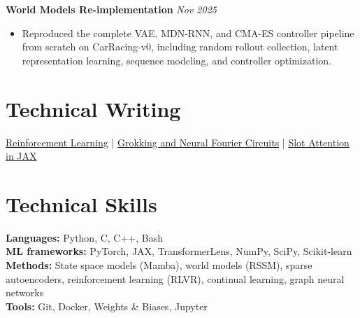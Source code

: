 \documentclass[10pt,a4paper]{article}
\begin{document}
\textbf{World Models Re-implementation}  \hfill \textit{Nov 2025}
\begin{itemize}
  \item Reproduced the complete VAE, MDN-RNN, and CMA-ES controller pipeline from scratch on CarRacing-v0, including random rollout collection, latent representation learning, sequence modeling, and controller optimization.
\end{itemize}

\section{Technical Writing}
\href{https://rithinnagaraj.github.io/posts/intro-to-rl-blog/}{Reinforcement Learning}
\quad | \quad
\href{https://rithinnagaraj.github.io/posts/grokking-neural-fourier-circuits/}{Grokking and Neural Fourier Circuits}
\quad | \quad
\href{https://rithinnagaraj.github.io/posts/slot-attention-jax/}{Slot Attention in JAX}

\section{Technical Skills}
\textbf{Languages:} Python, C, C++, Bash \\
\textbf{ML frameworks:} PyTorch, JAX, TransformerLens, NumPy, SciPy, Scikit-learn \\
\textbf{Methods:} State space models (Mamba), world models (RSSM), sparse autoencoders, reinforcement learning (RLVR), continual learning, graph neural networks \\
\textbf{Tools:} Git, Docker, Weights \& Biases, Jupyter
\end{document}
